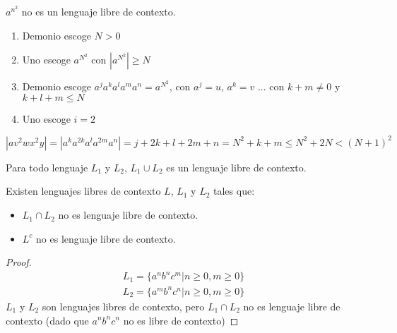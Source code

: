 \documentclass[a4paper,twoside,master.tex]{article}
\begin{document}
\begin{ej}
    $a^{n^2}$ no es un lenguaje libre de contexto.
    \begin{enumerate}
        \item Demonio escoge $N > 0$
        \item Uno escoge $a^{N^2}$ con $|a^{N^2}| \ge N$
        \item Demonio escoge $a^{j}a^{k}a^{l}a^{m}a^{n} = a^{N^2}$, con $a^{j} = u$, $a^{k} = v$ ... con $k + m \neq 0$ y $k + l + m \le N$
        \item Uno escoge $i = 2$
    \end{enumerate}
    $|av^2wx^2y| = |a^{k}a^{2k}a^{l}a^{2m}a^{n}| = j + 2k + l + 2m + n = N^2 + k + m \le N^2 + 2N < (N + 1)^2$
\end{ej}

\begin{proposicion}
    Para todo lenguaje $L_1$ y $L_2$, $L_1 \cup L_2$ es un lenguaje libre de contexto.

    Existen lenguajes libres de contexto $L$, $L_1$ y $L_2$ tales que:
    \begin{itemize}
        \item $L_1 \cap L_2$ no es lenguaje libre de contexto.
        \item $L^{c}$ no es lenguaje libre de contexto.
    \end{itemize}
\end{proposicion}

\begin{proof}
    \begin{align}
        L_1 = \{a^{n}b^{n}c^{m} | n \ge 0, m \ge 0\} \\
        L_2 = \{a^{m}b^{n}c^{n} | n \ge 0, m \ge 0\}
    \end{align}
    $L_1$ y $L_2$ son lenguajes libres de contexto, pero $L_1 \cap L_2$ no es lenguaje libre de contexto (dado que $a^{n}b^{n}c^{n}$ no es libre de contexto)
\end{proof}
\end{document}
